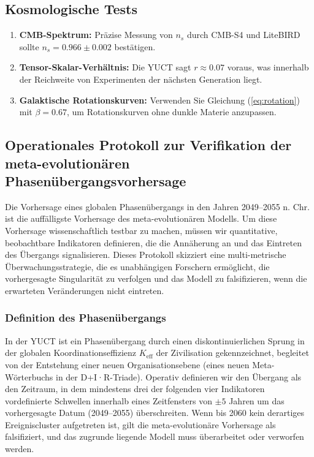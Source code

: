 \documentclass[12pt,a4paper]{article}
\theoremstyle{remark}
\begin{document}
	\subsection{Kosmologische Tests}
	
	\begin{enumerate}
		\item \textbf{CMB-Spektrum:} Präzise Messung von $n_s$ durch CMB-S4 und LiteBIRD sollte $n_s = 0.966 \pm 0.002$ bestätigen.
		\item \textbf{Tensor-Skalar-Verhältnis:} Die YUCT sagt $r \approx 0.07$ voraus, was innerhalb der Reichweite von Experimenten der nächsten Generation liegt.
		\item \textbf{Galaktische Rotationskurven:} Verwenden Sie Gleichung (\ref{eq:rotation}) mit $\beta = 0.67$, um Rotationskurven ohne dunkle Materie anzupassen.
	\end{enumerate}
	
	\subsection{Operationales Protokoll zur Verifikation der meta-evolutionären Phasenübergangsvorhersage}
	\label{subsec:forecast-protocol}
	
	Die Vorhersage eines globalen Phasenübergangs in den Jahren 2049–2055 n. Chr. ist die auffälligste Vorhersage des meta-evolutionären Modells. Um diese Vorhersage wissenschaftlich testbar zu machen, müssen wir quantitative, beobachtbare Indikatoren definieren, die die Annäherung an und das Eintreten des Übergangs signalisieren. Dieses Protokoll skizziert eine multi-metrische Überwachungsstrategie, die es unabhängigen Forschern ermöglicht, die vorhergesagte Singularität zu verfolgen und das Modell zu falsifizieren, wenn die erwarteten Veränderungen nicht eintreten.
	
	\subsubsection{Definition des Phasenübergangs}
	
	In der YUCT ist ein Phasenübergang durch einen diskontinuierlichen Sprung in der globalen Koordinationseffizienz $K_{\text{eff}}$ der Zivilisation gekennzeichnet, begleitet von der Entstehung einer neuen Organisationsebene (eines neuen Meta-Wörterbuchs in der D+I·R-Triade). Operativ definieren wir den Übergang als den Zeitraum, in dem mindestens drei der folgenden vier Indikatoren vordefinierte Schwellen innerhalb eines Zeitfensters von $\pm 5$ Jahren um das vorhergesagte Datum (2049–2055) überschreiten. Wenn bis 2060 kein derartiges Ereigniscluster aufgetreten ist, gilt die meta-evolutionäre Vorhersage als falsifiziert, und das zugrunde liegende Modell muss überarbeitet oder verworfen werden.
	
\end{document}
